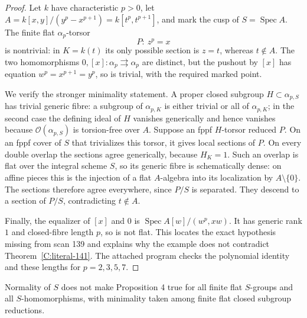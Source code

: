 \begin{proof}
Let $k$ have characteristic $p>0$, let
$A=k[x,y]/(y^p-x^{p+1})=k[t^p,t^{p+1}]$, and mark the cusp of
$S=\operatorname{Spec}A$.  The finite flat $\alpha_p$-torsor
\[
P:\ z^p=x
\]
is nontrivial: in $K=k(t)$ its only possible section is $z=t$, whereas
$t\notin A$.  The two homomorphisms $0,[x]\colon\alpha_p\rightrightarrows
\alpha_p$ are distinct, but the pushout by $[x]$ has equation
$w^p=x^{p+1}=y^p$, so is trivial, with the required marked point.

We verify the stronger minimality statement.  A proper closed subgroup
$H\subset\alpha_{p,S}$ has trivial generic fibre: a subgroup of
$\alpha_{p,K}$ is either trivial or all of $\alpha_{p,K}$; in the
second case the defining ideal of $H$ vanishes generically and hence
vanishes because $\mathcal O(\alpha_{p,S})$ is torsion-free over $A$.
Suppose an fppf $H$-torsor reduced $P$.  On an fppf cover of $S$ that
trivializes this torsor, it gives local sections of $P$.  On every
double overlap the sections agree generically, because $H_K=1$.
Such an overlap is flat over the integral scheme $S$, so its generic
fibre is schematically dense: on affine pieces this is the injection
of a flat $A$-algebra into its localization by $A\setminus\{0\}$.
The sections therefore agree everywhere, since $P/S$ is separated.
They descend to a section of $P/S$, contradicting $t\notin A$.

Finally, the equalizer of $[x]$ and $0$ is
$\operatorname{Spec}A[w]/(w^p,xw)$.  It has generic rank $1$ and
closed-fibre length $p$, so is not flat.  This locates the exact
hypothesis missing from scan 139 and explains why the example does
not contradict Theorem~\ref{C:literal-141}.  The attached program checks
the polynomial identity and these lengths for $p=2,3,5,7$.
\end{proof}

\begin{proposition}
\label{C:normal-counterexample}
Normality of $S$ does not make Proposition 4 true for all finite flat
$S$-groups and all $S$-homomorphisms, with minimality taken among finite
flat closed subgroup reductions.
\end{proposition}

